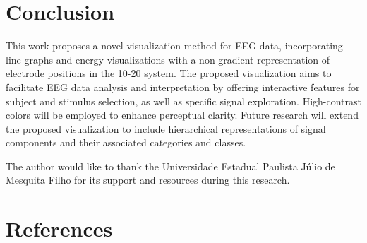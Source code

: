 \documentclass[format=sigconf]{acmart}
\begin{document}
	\section{Conclusion}
		\par This work proposes a novel visualization method for EEG data, incorporating line graphs and energy visualizations with a non-gradient representation of electrode positions in the 10-20 system. The proposed visualization aims to facilitate EEG data analysis and interpretation by offering interactive features for subject and stimulus selection, as well as specific signal exploration. High-contrast colors will be employed to enhance perceptual clarity. Future research will extend the proposed visualization to include hierarchical representations of signal components and their associated categories and classes.
	
	\begin{acks}
		The author would like to thank the Universidade Estadual Paulista Júlio de Mesquita Filho for its support and resources during this research.
	\end{acks}
	
	\section{References}
	
	
	
\end{document}
